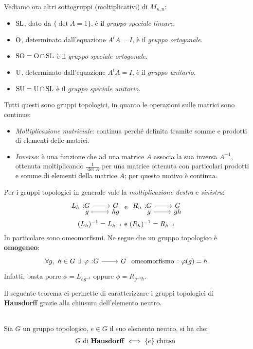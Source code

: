 Vediamo ora altri sottogruppi (moltiplicativi) di $M_{n,n}$:
	\begin{itemize}
		\item $\operatorname{SL}$, dato da $\{\det A=1\} $, è il \textit{gruppo speciale lineare}.
		\item $\operatorname{O}$, determinato dall'equazione $A^{t}A=I$, è il \textit{gruppo ortogonale}.
		\item $\operatorname{SO}=\operatorname{O}\cap\operatorname{SL}$ è il \textit{gruppo speciale ortogonale}.
		\item $\operatorname{U}$, determinato dall'equazione $A^{t}\overline{A}=I$, è il \textit{gruppo unitario}.
		\item $\operatorname{SU}=\operatorname{U}\cap\operatorname{SL}$ è il \textit{gruppo speciale unitario}.
	\end{itemize}
Tutti questi sono gruppi topologici, in quanto le operazioni sulle matrici sono continue:
	\begin{itemize}
		\item \textit{Moltiplicazione matriciale}: continua perché definita tramite somme e prodotti di elementi delle matrici.
		\item \textit{Inverso}: è una funzione che ad una matrice $A$ associa la sua inversa $A^{-1}$, ottenuta moltiplicando $\displaystyle \frac{1}{\det A}$ per una matrice ottenuta con particolari prodotti e somme di elementi della matrice $A$; per questo motivo è continua.
	\end{itemize}
\begin{observe}
	Per i gruppi topologici in generale vale la \textit{moltiplicazione destra} e \textit{sinistra}:
		\begin{gather*}
			\funztot {L_h} G G g {hg} \text{   e   } \funztot {R_n}  G G g {gh} \\
			(L_h)^{-1}=L_{h^{-1}} \text{   e   } (R_h)^{-1}=R_{h^{-1}}
		\end{gather*}
	In particolare sono omeomorfismi. Ne segue che un gruppo topologico è \textbf{omogeneo}:
		\begin{gather*}
			\forall g,\ h\in G \ \exists \funz \phi G G \text{ omeomorfismo}\ \colon \phi(g)=h
		\end{gather*}
	Infatti, basta porre $\phi=L_{hg^{-1}}$ oppure $\phi=R_{g^{-1}h}$.
\end{observe}
Il seguente teorema ci permette di caratterizzare i gruppi topologici di \textbf{Hausdorff} grazie alla chiusura dell'elemento neutro.
\begin{theorema}~{}\\
	Sia $G$ un gruppo topologico, $e\in G$ il suo elemento neutro, si ha che:
		\begin{gather*}
			G \ \text{di \textbf{Hausdorff}} \iff \{e\} \text{ chiuso }
		\end{gather*}
	\vspace{-6mm}
\end{theorema}
